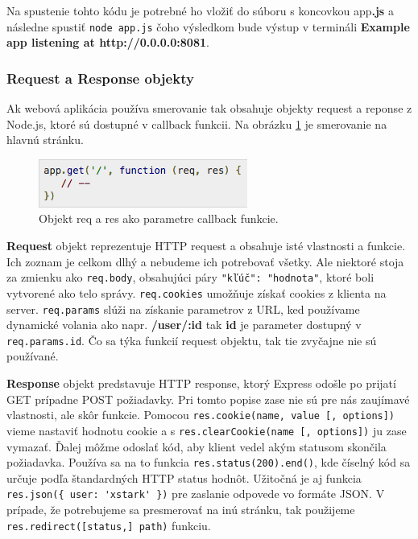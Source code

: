 Na spustenie tohto kódu je potrebné ho vložiť do súboru s koncovkou app\textbf{.js} a následne spustiť \verb|node app.js| čoho výsledkom bude výstup v termináli \textbf{Example app listening at http://0.0.0.0:8081}.

\subsubsection{Request a Response objekty}
Ak webová aplikácia používa smerovanie tak obsahuje objekty request a reponse z Node.js, ktoré sú dostupné v callback funkcii. Na obrázku \ref{express-res-req} je smerovanie na hlavnú stránku.\cite{express-tutorial}

\begin{figure}[H]
  \centering
  \includegraphics[scale=0.7]{img/express/express-req.png}
  \caption{Objekt req a res ako parametre callback funkcie.}
  \label{express-res-req}
\end{figure}

\textbf{Request} objekt reprezentuje HTTP request a obsahuje isté vlastnosti a funkcie. Ich zoznam je celkom dlhý a nebudeme ich potrebovať všetky. Ale niektoré stoja za zmienku ako \verb|req.body|, obsahujúci páry \verb|"kľúč": "hodnota"|, ktoré boli vytvorené ako telo správy. \verb|req.cookies| umožňuje získať cookies z klienta na server. \verb|req.params| slúži na získanie parametrov z URL, ked používame dynamické volania ako napr. \textbf{/user/:id} tak \textbf{id} je parameter dostupný v \verb|req.params.id|. Čo sa týka funkcií request objektu, tak tie zvyčajne nie sú používané.\cite{nodejs-exp-request}

\textbf{Response} objekt predstavuje HTTP response, ktorý Express odošle po prijatí GET prípadne POST požiadavky. Pri tomto popise zase nie sú pre nás zaujímavé vlastnosti, ale skôr funkcie. Pomocou \verb|res.cookie(name, value [, options])| vieme nastaviť hodnotu cookie a s \verb|res.clearCookie(name [, options])| ju zase vymazať. Ďalej môžme odoslať kód, aby klient vedel akým statusom skončila požiadavka. Používa sa na to funkcia \verb|res.status(200).end()|, kde číselný kód sa určuje podľa štandardných HTTP status hodnôt. Užitočná je aj funkcia \verb|res.json({ user: 'xstark' })| pre zaslanie odpovede vo formáte JSON. V prípade, že potrebujeme sa presmerovať na inú stránku, tak použijeme \verb|res.redirect([status,] path)| funkciu.\cite{nodejs-exp-response}

